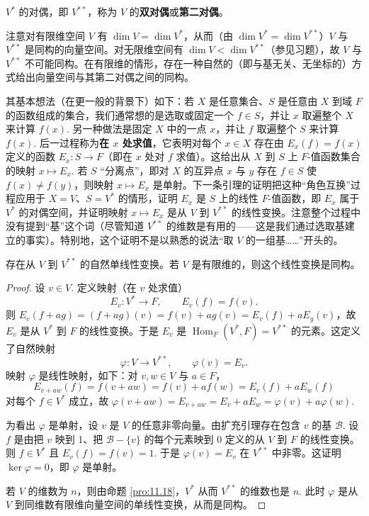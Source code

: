 \begin{definition}
\(V^*\) 的对偶，即 \(V^{**}\)，称为 \(V\) 的\textbf{双对偶}或\textbf{第二对偶}。
\end{definition}

注意对有限维空间 \(V\) 有 \(\dim V = \dim V^*\)，从而（由 \(\dim V^* = \dim V^{**}\)）\(V\) 与 \(V^{**}\) 是同构的向量空间。对无限维空间有 \(\dim V < \dim V^{**}\)（参见习题），故 \(V\) 与 \(V^{**}\) 不可能同构。在有限维的情形，存在一种自然的（即与基无关、无坐标的）方式给出向量空间与其第二对偶之间的同构。

其基本想法（在更一般的背景下）如下：若 \(X\) 是任意集合、\(S\) 是任意由 \(X\) 到域 \(F\) 的函数组成的集合，我们通常想的是选取或固定一个 \(f \in S\)，并让 \(x\) 取遍整个 \(X\) 来计算 \(f(x)\). 另一种做法是固定 \(X\) 中的一点 \(x\)，并让 \(f\) 取遍整个 \(S\) 来计算 \(f(x)\). 后一过程称为\textbf{在 \(x\) 处求值}，它表明对每个 \(x \in X\) 存在由 \(E_x(f) = f(x)\) 定义的函数 \(E_x : S \to F\)（即在 \(x\) 处对 \(f\) 求值）。这给出从 \(X\) 到 \(S\) 上 \(F\)-值函数集合的映射 \(x \mapsto E_x\). 若 \(S\) “分离点”，即对 \(X\) 的互异点 \(x\) 与 \(y\) 存在 \(f \in S\) 使 \(f(x) \neq f(y)\)，则映射 \(x \mapsto E_x\) 是单射。下一条引理的证明把这种“角色互换”过程应用于 \(X = V\)、\(S = V^*\) 的情形，证明 \(E_x\) 是 \(S\) 上的线性 \(F\)-值函数，即 \(E_x\) 属于 \(V^*\) 的对偶空间，并证明映射 \(x \mapsto E_x\) 是从 \(V\) 到 \(V^{**}\) 的线性变换。注意整个过程中没有提到“基”这个词（尽管知道 \(V^{**}\) 的维数是有用的——这是我们通过选取基建立的事实）。特别地，这个证明不是以熟悉的说法“取 \(V\) 的一组基……”开头的。

\begin{theorem}\label{thm:11.19}
存在从 \(V\) 到 \(V^{**}\) 的自然单线性变换。若 \(V\) 是有限维的，则这个线性变换是同构。
\end{theorem}

\begin{proof}
设 \(v \in V\). 定义映射（在 \(v\) 处求值）
\[
E_v : V^* \to F, \qquad E_v(f) = f(v).
\]
则 \(E_v(f+ag) = (f+ag)(v) = f(v)+ag(v) = E_v(f)+aE_g(v)\)，故 \(E_v\) 是从 \(V^*\) 到 \(F\) 的线性变换。于是 \(E_v\) 是 \(\operatorname{Hom}_F(V^*, F) = V^{**}\) 的元素。这定义了自然映射
\[
\varphi : V \to V^{**}, \qquad \varphi(v) = E_v.
\]
映射 \(\varphi\) 是线性映射，如下：对 \(v, w \in V\) 与 \(a \in F\)，
\[
E_{v+aw}(f) = f(v+aw) = f(v)+af(w) = E_v(f)+aE_w(f)
\]
对每个 \(f \in V^*\) 成立，故 \(\varphi(v+aw) = E_{v+aw} = E_v+aE_w = \varphi(v)+a\varphi(w)\).

为看出 \(\varphi\) 是单射，设 \(v\) 是 \(V\) 的任意非零向量。由扩充引理存在包含 \(v\) 的基 \(\mathcal{B}\). 设 \(f\) 是由把 \(v\) 映到 1、把 \(\mathcal{B}-\{v\}\) 的每个元素映到 0 定义的从 \(V\) 到 \(F\) 的线性变换。则 \(f \in V^*\) 且 \(E_v(f) = f(v) = 1\). 于是 \(\varphi(v) = E_v\) 在 \(V^{**}\) 中非零。这证明 \(\ker\varphi = 0\)，即 \(\varphi\) 是单射。

若 \(V\) 的维数为 \(n\)，则由命题 \ref{pro:11.18}，\(V^*\) 从而 \(V^{**}\) 的维数也是 \(n\). 此时 \(\varphi\) 是从 \(V\) 到同维数有限维向量空间的单线性变换，从而是同构。
\end{proof}

